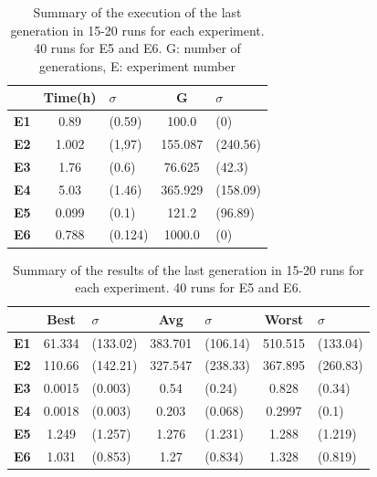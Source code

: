 \documentclass[a4paper,twoside]{article}
\newcommand{\myfloatalign}{\centering}
\begin{document}
\begin{table}
	\myfloatalign
	\begin{tabular}{cclcl}
		& \textbf{Time(h)} &$\sigma$ & \textbf{G}& $\sigma$ \\ \hline
		\textbf{E1}&0.89&(0.59)&100.0&(0)\\  \hline
		\textbf{E2}&1.002&(1,97)&155.087&(240.56) \\  \hline
		\textbf{E3}&1.76&(0.6)&76.625&(42.3)\\  \hline
		\textbf{E4}&5.03&(1.46)&365.929&(158.09)  \\  \hline
		\textbf{E5}&0.099&(0.1)&121.2&(96.89)     \\  \hline 
		\textbf{E6}&0.788&(0.124)&1000.0&(0) \\  \hline
		\hline
	\end{tabular}
	\caption{Summary of the execution of the last generation in 15-20 runs for each
		experiment. 40 runs for E5 and E6.
		G: number of generations, E: experiment 
		number} %
	\label{t:resOver1}
\end{table}

\begin{table}
	\myfloatalign
	\begin{tabular}{cclclcl}
		& \textbf{Best}& $\sigma$  &\textbf{Avg}&$\sigma$  & \textbf{Worst}&$\sigma$ \\ \hline
		\textbf{E1}&61.334&(133.02)&383.701&(106.14)&510.515&(133.04)\\  \hline
		\textbf{E2}&110.66&(142.21)&327.547&(238.33)&367.895&(260.83)  \\  \hline
		\textbf{E3}&0.0015&(0.003)&0.54&(0.24)&0.828&(0.34)   \\  \hline
		\textbf{E4}&0.0018&(0.003)&0.203&(0.068)&0.2997&(0.1)  \\  \hline
		\textbf{E5}& 1.249&(1.257)&1.276&(1.231)&1.288&(1.219)     \\  \hline 
		\textbf{E6}& 1.031&(0.853)&1.27&(0.834)&1.328&(0.819) \\  \hline
		\hline
	\end{tabular}
	\caption{Summary of the results of the last generation in 15-20 runs for each
		experiment. 40 runs for E5 and E6.
		} %
	\label{t:resOver2}
\end{table}
\end{document}
